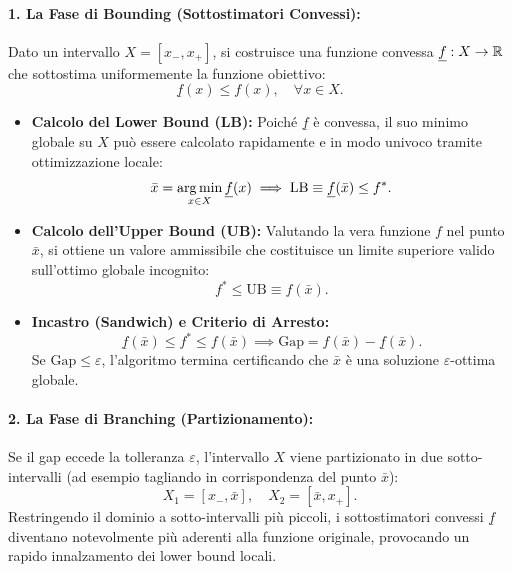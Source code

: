 \paragraph{1. La Fase di Bounding (Sottostimatori Convessi):}
Dato un intervallo $X = [x_-, x_+]$, si costruisce una funzione convessa $\underline{f}: X \to \mathbb{R}$ che sottostima uniformemente la funzione obiettivo:
\begin{equation}
    \underline{f}(x) \le f(x), \quad \forall x \in X.
\end{equation}
\begin{itemize}
    \item \textbf{Calcolo del Lower Bound (LB):} Poich\'e $\underline{f}$ \`e convessa, il suo minimo globale su $X$ pu\`o essere calcolato rapidamente e in modo univoco tramite ottimizzazione locale:
    \begin{equation}
        \bar{x} = \operatorname*{arg\,min}_{x \in X} \underline{f}(x) \implies \text{LB} \equiv \underline{f}(\bar{x}) \le f^*.
    \end{equation}
    \item \textbf{Calcolo dell'Upper Bound (UB):} Valutando la vera funzione $f$ nel punto $\bar{x}$, si ottiene un valore ammissibile che costituisce un limite superiore valido sull'ottimo globale incognito:
    \begin{equation}
        f^* \le \text{UB} \equiv f(\bar{x}).
    \end{equation}
    \item \textbf{Incastro (Sandwich) e Criterio di Arresto:}
    \begin{equation}
        \underline{f}(\bar{x}) \le f^* \le f(\bar{x}) \implies \text{Gap} = f(\bar{x}) - \underline{f}(\bar{x}).
    \end{equation}
    Se $\text{Gap} \le \varepsilon$, l'algoritmo termina certificando che $\bar{x}$ \`e una soluzione $\varepsilon$-ottima globale.
\end{itemize}

\paragraph{2. La Fase di Branching (Partizionamento):}
Se il gap eccede la tolleranza $\varepsilon$, l'intervallo $X$ viene partizionato in due sotto-intervalli (ad esempio tagliando in corrispondenza del punto $\bar{x}$):
\begin{equation}
    X_1 = [x_-, \bar{x}], \quad X_2 = [\bar{x}, x_+].
\end{equation}
Restringendo il dominio a sotto-intervalli pi\`u piccoli, i sottostimatori convessi $\underline{f}$ diventano notevolmente pi\`u aderenti alla funzione originale, provocando un rapido innalzamento dei lower bound locali.

